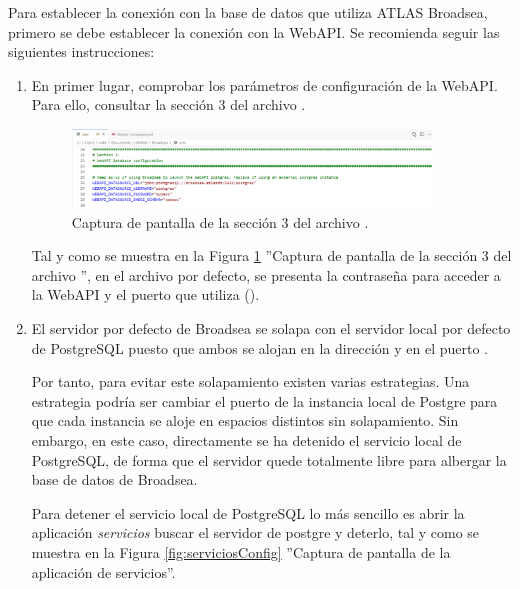Para establecer la conexión con la base de datos que utiliza ATLAS Broadsea, primero se debe establecer la conexión con la WebAPI. Se recomienda seguir las siguientes instrucciones:

\begin{enumerate}

    \item En primer lugar, comprobar los parámetros de configuración de la WebAPI. Para ello, consultar la sección 3 del archivo .
    
    \begin{figure}[H]
    \centering
    \includegraphics[width=0.90\textwidth]{figures/seccion3env.png}
     \caption{Captura de pantalla de la sección 3 del archivo .}
    \label{fig:seccion3env}
    \end{figure}


    Tal y como se muestra en la Figura \ref{fig:seccion3env} ''Captura de pantalla de la sección 3 del archivo '', en el archivo por defecto, se presenta la contraseña para acceder a la WebAPI  y el puerto que utiliza ().

    \item El servidor por defecto de Broadsea se solapa con el servidor local por defecto de PostgreSQL puesto que ambos se alojan en la dirección  y en el puerto . 
    
    Por tanto, para evitar este solapamiento existen varias estrategias. Una estrategia podría ser cambiar el puerto de la instancia local de Postgre para que cada instancia se aloje en espacios distintos sin solapamiento. Sin embargo, en este caso, directamente se ha detenido el servicio local de PostgreSQL, de forma que el servidor quede totalmente libre para albergar la base de datos de Broadsea.

    Para detener el servicio local de PostgreSQL lo más sencillo es abrir la aplicación \textit{servicios} buscar el servidor de postgre y deterlo, tal y como se muestra en la Figura \ref{fig:serviciosConfig} ''Captura de pantalla de la aplicación de servicios''.


\end{enumerate}
